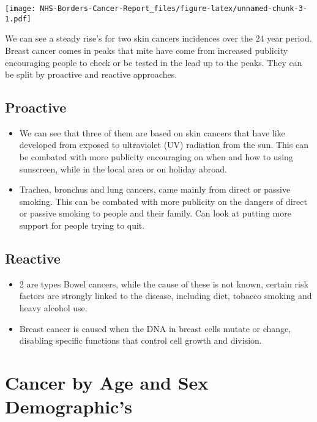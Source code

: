 \documentclass[
]{article}
\begin{document}
\texttt{[image: NHS-Borders-Cancer-Report\_files/figure-latex/unnamed-chunk-3-1.pdf]}

We can see a steady rise's for two skin cancers incidences over the 24
year period. Breast cancer comes in peaks that mite have come from
increased publicity encouraging people to check or be tested in the lead
up to the peaks. They can be split by proactive and reactive approaches.

\hypertarget{proactive}{%
\subsection{Proactive}\label{proactive}}

\begin{itemize}
\item
  We can see that three of them are based on skin cancers that have like
  developed from exposed to ultraviolet (UV) radiation from the sun.
  This can be combated with more publicity encouraging on when and how
  to using sunscreen, while in the local area or on holiday abroad.
\item
  Trachea, bronchus and lung cancers, came mainly from direct or passive
  smoking. This can be combated with more publicity on the dangers of
  direct or passive smoking to people and their family. Can look at
  putting more support for people trying to quit.
\end{itemize}

\hypertarget{reactive}{%
\subsection{Reactive}\label{reactive}}

\begin{itemize}
\item
  2 are types Bowel cancers, while the cause of these is not known,
  certain risk factors are strongly linked to the disease, including
  diet, tobacco smoking and heavy alcohol use.
\item
  Breast cancer is caused when the DNA in breast cells mutate or change,
  disabling specific functions that control cell growth and division.
\end{itemize}

\hypertarget{cancer-by-age-and-sex-demographics}{%
\section{Cancer by Age and Sex
Demographic's}\label{cancer-by-age-and-sex-demographics}}
\end{document}
